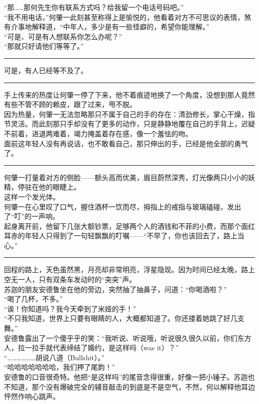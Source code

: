\documentclass[oneside,11pt]{memoir} %
\begin{document}
\begin{CJK}{UTF8}{gbsn}
    “那……那何先生你有联系方式吗？给我留一个电话号码吧。”\\\indent
    “我不用电话，”何肇一此刻甚至称得上是愉悦的，他看着对方不可思议的表情，煞有介事地解释道，“中年人，多少是有一些怪癖的，希望你能理解。”\\\indent
    “可是、可是有人想联系你怎么办呢？”\\\indent
    “那就只好请他们等等了。”\\\indent
\rule{-3pt}{30pt}
    可是，有人已经等不及了。\\\indent
\rule{-3pt}{30pt}
    手上传来的热度让何肇一停了下来，他不着痕迹地换了一个角度，没想到那人竟然有些不管不顾的赖皮，跟了过来，甩不脱。\\\indent
    因为热量，何肇一无法忽略那只不属于自己的手的存在：清劲修长，掌心干燥，指节灵活。而此刻那只手却没有了更多的动作，只是静静地覆在自己的手背上，迟疑不前着，进退两难着，竭力掩盖着存在感，像一个羞怯的吻。\\\indent
    面前这年轻人没有再说话，也不敢看自己，那只伸出的手，已经是他全部的勇气了。\\\indent
\rule{-3pt}{30pt} 
    何肇一打量着对方的侧脸——额头高而优美，眉目蔚然深秀，灯光像两只小小的妖精，停驻在他的眼睫上。\\\indent
    这样一个发光体。\\\indent
    何肇一在心里叹了口气，握住酒杯一饮而尽，拇指上的戒指与玻璃磕碰，发出了“叮”的一声响。\\\indent
    起身离开前，他留下几张大额钞票，足够两个人的酒钱和不菲的小费，而那个面红耳赤的年轻人只得到了一句轻飘飘的叮嘱——“不早了，你也该回去了，路上当心。”\\\indent
\rule{-3pt}{30pt} 
    回程的路上，天色虽然黑，月亮却非常明亮，浮星隐现。因为时间已经太晚，路上空无一人，只有双条车发动时的“突突”声。\\\indent
    苏迦的朋友安德鲁坐在他的旁边，突然抽了抽鼻子，问道：“你喝酒啦？”\\\indent
    “喝了几杯，不多。”\\\indent
    “诶！你知道吗？我今天牵到了米娅的手！”\\\indent
    “不只我知道，世界上只要有眼睛的人，大概都知道了。你还搂着她跳了好几支舞。”\\\indent
    安德鲁露出了一个傻乎乎的笑：“我听说、听说哦，听说很久很久以前，你们东方人，拉一拉手就代表缔结了婚约，是这样吗（was it）？”\\\indent
    “………………胡说八道（Bullshit）。”\\\indent
     “哈哈哈哈哈哈哈，我们押了尾韵！”\\\indent
    安德鲁的口音很奇特。他把“是这样吗”的尾音念得很重，好像一把小锤子。苏迦也不知道，那个没有爆破完全的辅音敲击的到底是不是空气，不然，何以解释他耳边怦然作响心跳声。 
\newpage

\end{CJK}
\end{document}
